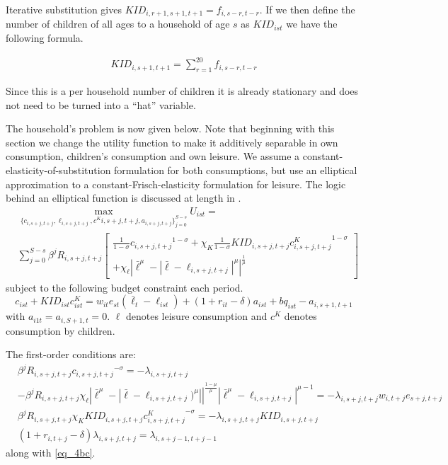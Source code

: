 \documentclass[letterpaper,12pt]{article}
\theoremstyle{definition}
\numberwithin{equation}{section}
\begin{document}
\begin{spacing}{1.5}
	Iterative substitution gives $KID_{i,r+1,s+1,t+1} = f_{i,s-r,t-r}$.  If we then define the number of children of all ages to a household of age $s$ as $KID_{ist}$ we have the following formula.

	\begin{align}
		KID_{i,s+1,t+1} = \sum_{r=1}^{20} f_{i,s-r,t-r}
	\end{align}

	Since this is a per household number of children it is already stationary and does not need to be turned into a ``hat'' variable.

	The household's problem is now given below.  Note that beginning with this section we change the utility function to make it additively separable in own consumption, children's consumption and own leisure.  We assume a constant-elasticity-of-substitution formulation for both consumptions, but use an elliptical approximation to a constant-Frisch-elasticity formulation for leisure.  The logic behind an elliptical function is discussed at length in \citet{EvansPhillips:2015}.
	\begin{equation}
		\begin{split}
		& \max_{\{c_{i,s+j,t+j},\ell_{i,s+j,t+j},c^K{i,s+j,t+j},a_{i,s+j,t+j}\}_{j=0}^{S-s}} U_{ist} = \\
		& \sum_{j=0}^{S-s} \beta^j R_{i,s+j,t+j} \begin{bmatrix} \frac{1}{1-\sigma} {c_{i,s+j,t+j}}^{1-\sigma} + \chi_K \frac{1}{1-\sigma} KID_{i,s+j,t+j}{c^K_{i,s+j,t+j}}^{1-\sigma} \\ + \chi_\ell \left| \bar \ell^\mu - |\bar \ell-\ell_{i,s+j,t+j}|^\mu \right|^{\frac{1}{\mu}} \end{bmatrix} \nonumber
		\end{split}
	\end{equation}
	subject to the following budget constraint each period.
	\begin{equation} \label{eq_4bc}
		c_{ist} + KID_{ist}c^K_{ist} = w_{it} e_{st} (\bar \ell_t -\ell_{ist}) + (1+r_{it}-\delta)a_{ist} + bq_{ist} - a_{i,s+1,t+1}
	\end{equation}
	with $a_{i1t} = a_{i,S+1,t} = 0$.  $\ell$ denotes leisure consumption and $c^K$ denotes consumption by children.

	The first-order conditions are:
	\begin{align}
		& \beta^j R_{i,s+j,t+j} {c_{i,s+j,t+j}}^{-\sigma} =  - \lambda_{i,s+j,t+j}  \label{eq_4foc1} \\
		& - \beta^j R_{i,s+j,t+j} \chi_\ell \left| \bar \ell^\mu - |\bar \ell-\ell_{i,s+j,t+j})^\mu| \right|^{\frac{1-\mu}{\mu}}|\bar \ell^\mu-\ell_{i,s+j,t+j}|^{\mu-1}  = - \lambda_{i,s+j,t+j} w_{i,t+j} e_{s+j,t+j} \label{eq_4foc2} \\
		& \beta^j R_{i,s+j,t+j} \chi_K KID_{i,s+j,t+j}{c^K_{i,s+j,t+j}}^{-\sigma} = - \lambda_{i,s+j,t+j} KID_{i,s+j,t+j} \label{eq_4foc3} \\
        & (1+r_{i,t+j}-\delta) \lambda_{i,s+j,t+j} = \lambda_{i,s+j-1,t+j-1} \label{eq_4foc4}
	\end{align}	
	along with \eqref{eq_4bc}.


\end{spacing}
\end{document}
